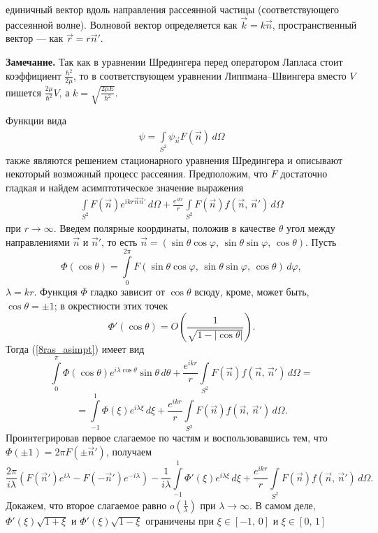 \documentclass[a4paper
]{article}
\begin{document}
единичный вектор вдоль направления рассеянной частицы (соответствующего
рассеянной волне). Волновой вектор определяется как $\vec k=k\vec n$,
пространственный вектор --- как $\vec r=r\vec n'$. \par
{\bf Замечание.} Так как в уравнении Шредингера перед оператором Лапласа
стоит коэффициент $\frac{\hbar^2}{2\mu}$, то в соответствующем уравнении
Липпмана--Швингера вместо $V$ пишется $\frac{2\mu}{\hbar^2}V$, а $k=
\sqrt{\frac{2\mu E}{\hbar^2}}$. \par
Функции вида
\begin{align}
\label{psi_int_s2_psin}
\psi=\int \limits_{S^2}\psi_{\vec n}F(\vec n)\, d\Omega
\end{align}
также являются решением стационарного уравнения Шредингера и описывают
некоторый возможный процесс рассеяния. Предположим, что $F$ достаточно
гладкая и найдем асимптотическое значение выражения
\begin{align}
\label{8ras_asimpt}
\int \limits_{S^2}F(\vec n)e^{ikr\vec n\vec n'}\, d\Omega+\frac{e^{ikr}}
{r}\int \limits_{S^2}F(\vec n)f(\vec n, \, \vec n')\, d\Omega
\end{align}
при $r\rightarrow \infty$. Введем полярные координаты, положив в качестве
$\theta$ угол между направлениями $\vec n$ и $\vec n'$, то есть
$\vec n=(\sin \theta \cos \varphi, \, \sin \theta \sin \varphi, \, \cos \theta)$.
Пусть $$\Phi(\cos \theta)=\int \limits _0^{2\pi}F(\sin \theta \cos \varphi,
\, \sin \theta \sin \varphi, \, \cos \theta)\, d\varphi,$$ $\lambda=kr$.
Функция $\Phi$ гладко зависит от $\cos \theta$ всюду, кроме, может быть, $\cos
\theta=\pm 1$; в окрестности этих точек $$\Phi'(\cos \theta)=O\left(
\frac{1}{\sqrt{1-|\cos \theta|}}\right).$$
Тогда (\ref{8ras_asimpt}) имеет вид
$$\int \limits_0^{\pi}\Phi(\cos \theta)e^{i\lambda\cos \theta}\sin \theta
\, d\theta+\frac{e^{ikr}}{r}\int \limits_{S^2}F(\vec n)f(\vec n, \,
\vec n')\, d\Omega=$$ $$=\int \limits_{-1}^1\Phi(\xi)e^{i\lambda\xi}
\, d\xi+\frac{e^{ikr}}{r}\int \limits_{S^2}F(\vec n)f(\vec n, \, \vec n')
\, d\Omega.$$ Проинтегрировав первое слагаемое по частям и воспользовавшись
тем, что $\Phi(\pm 1)=2\pi F(\pm \vec n')$, получаем
$$\frac{2\pi}{i\lambda}(F(\vec n')e^{i\lambda}-F(-\vec n')e^{-i\lambda})-
\frac{1}{i\lambda}\int \limits_{-1}^1\Phi'(\xi)e^{i\lambda\xi}\, d\xi+
\frac{e^{ikr}}{r}\int \limits_{S^2}F(\vec n)f(\vec n, \, \vec n')\, d\Omega.$$
Докажем, что второе слагаемое равно $o(\frac{1}{\lambda})$ при $\lambda
\rightarrow \infty$. В самом деле, $\Phi'(\xi)\sqrt{1+\xi}$ и $\Phi'(\xi)
\sqrt{1-\xi}$ ограничены при $\xi\in [-1, \, 0]$ и $\xi\in [0, \, 1]$
\end{document}
